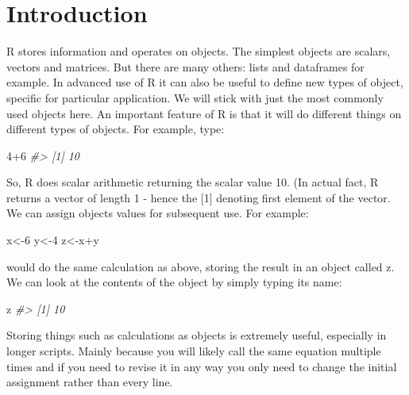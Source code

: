 \documentclass[
]{book}
\newenvironment{Shaded}{\begin{snugshade}}{\end{snugshade}}
\newcommand{\CommentTok}[1]{\textcolor[rgb]{0.56,0.35,0.01}{\textit{#1}}}
\newcommand{\DecValTok}[1]{\textcolor[rgb]{0.00,0.00,0.81}{#1}}
\newcommand{\NormalTok}[1]{#1}
\newcommand{\OtherTok}[1]{\textcolor[rgb]{0.56,0.35,0.01}{#1}}
\newcommand{\SpecialCharTok}[1]{\textcolor[rgb]{0.00,0.00,0.00}{#1}}
\begin{document}
\hypertarget{introduction-1}{%
\section{Introduction}\label{introduction-1}}

R stores information and operates on objects. The simplest objects are scalars, vectors and matrices.
But there are many others: lists and dataframes for example. In advanced use of R it can also be
useful to define new types of object, specific for particular application. We will stick with just the
most commonly used objects here.
An important feature of R is that it will do different things on different types of objects. For
example, type:

\begin{Shaded}
\begin{Highlighting}[]
\DecValTok{4}\SpecialCharTok{+}\DecValTok{6}
\CommentTok{\#\textgreater{} [1] 10}
\end{Highlighting}
\end{Shaded}

So, R does scalar arithmetic returning the scalar value 10. (In actual fact, R returns a vector of
length 1 - hence the {[}1{]} denoting first element of the vector.
We can assign objects values for subsequent use. For example:

\begin{Shaded}
\begin{Highlighting}[]
\NormalTok{x}\OtherTok{\textless{}{-}}\DecValTok{6}
\NormalTok{y}\OtherTok{\textless{}{-}}\DecValTok{4}
\NormalTok{z}\OtherTok{\textless{}{-}}\NormalTok{x}\SpecialCharTok{+}\NormalTok{y}
\end{Highlighting}
\end{Shaded}

would do the same calculation as above, storing the result in an object called z. We can look at
the contents of the object by simply typing its name:

\begin{Shaded}
\begin{Highlighting}[]
\NormalTok{z}
\CommentTok{\#\textgreater{} [1] 10}
\end{Highlighting}
\end{Shaded}

Storing things such as calculations as objects is extremely useful, especially in longer scripts. Mainly because you will likely call the same equation multiple times and if you need to revise it in any way you only need to change the initial assignment rather than every line.
\end{document}
